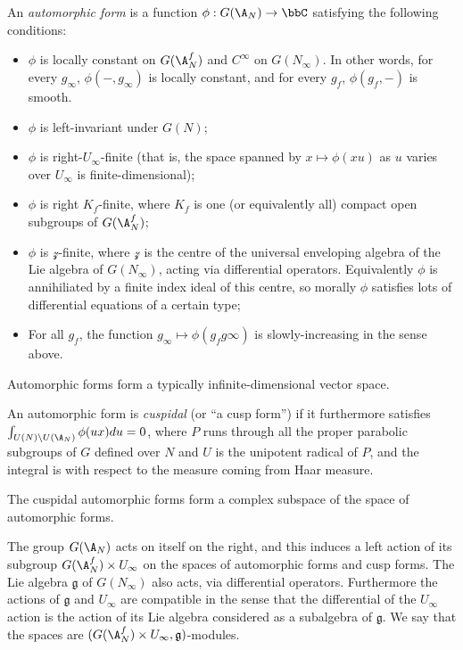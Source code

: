 \begin{definition}\label{automorphic_form}\notready An \emph{automorphic form} is a function $\phi:G(\A_N)\to\bbC$ satisfying the following conditions:
    \begin{itemize}
        \item $\phi$ is locally constant on $G(\A_N^f)$ and $C^\infty$ on $G(N_\infty)$. In other words, for every $g_\infty$, $\phi(-,g_\infty)$ is locally constant, and for every $g_f$, $\phi(g_f,-)$ is smooth.
        \item $\phi$ is left-invariant under $G(N)$;
        \item $\phi$ is right-$U_\infty$-finite (that is, the space spanned by $x\mapsto \phi(xu)$ as $u$ varies over $U_\infty$ is finite-dimensional);
        \item $\phi$ is right $K_f$-finite, where $K_f$ is one (or equivalently all) compact open subgroups of $G(\A_N^f)$;
        \item $\phi$ is $\mathcal{z}$-finite, where $\mathcal{z}$ is the centre of the universal enveloping algebra of the Lie algebra of $G(N_\infty)$, acting via differential operators. Equivalently $\phi$ is annihiliated by a finite index ideal of this centre, so morally $\phi$ satisfies lots of differential equations of a certain type;
        \item For all $g_f$, the function $g_\infty\mapsto \phi(g_f g\infty)$ is slowly-increasing in the sense above.
    \end{itemize}
\end{definition}

Automorphic forms form a typically infinite-dimensional vector space.

\begin{definition}\label{cuspidal_automorphic_form}\notready An automorphic form is \emph{cuspidal} (or ``a cusp form'') if it furthermore satisfies $\int_{U(N)\backslash U(\A_N)}\phi(ux)du=0$, where $P$ runs through all the proper parabolic subgroups of $G$ defined over $N$ and $U$ is the unipotent radical of $P$, and the integral is with respect to the measure coming from Haar measure.
\end{definition}

The cuspidal automorphic forms form a complex subspace of the space of automorphic forms.

\begin{definition}\label{automorphic_form_actions}\notready The group $G(\A_N)$ acts on itself on the right, and this induces a left action of its
    subgroup $G(\A_N^f)\times U_\infty$ on the spaces of automorphic forms and cusp forms. The Lie algebra $\mathfrak{g}$ of $G(N_\infty)$ also acts, via differential operators. Furthermore the actions of $\mathfrak{g}$ and $U_\infty$ are compatible in the sense that the differential of the $U_\infty$ action is the action of its Lie algebra considered as a subalgebra of $\mathfrak{g}$. We say that the spaces are $(G(\A_N^f)\times U_\infty,\mathfrak{g})$-modules.
\end{definition}

